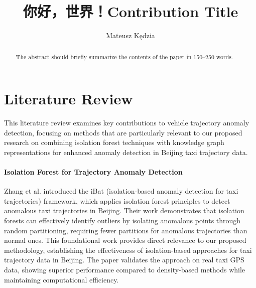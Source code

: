 \documentclass[runningheads]{llncs}
\newcommand{\zh}[1]{{\chinesefont #1}}
\begin{document}

\title{ \zh{你好，世界！}Contribution Title}
%
%
\author{Mateusz Kędzia}
%
\authorrunning{ \zh{你好，世界！} Author et al.}
%
%
\maketitle      %
%
\begin{abstract}
The abstract should briefly summarize the contents of the paper in
150--250 words.

\end{abstract}
%
%
\newpage

\section{Literature Review}
\label{sec:literature-review}

This literature review examines key contributions to vehicle trajectory anomaly detection, focusing on methods that are particularly relevant to our proposed research on combining isolation forest techniques with knowledge graph representations for enhanced anomaly detection in Beijing taxi trajectory data.

\paragraph{Isolation Forest for Trajectory Anomaly Detection}
Zhang et al. \cite{zhang2011ibat} introduced the iBat (isolation-based anomaly detection for taxi trajectories) framework, which applies isolation forest principles to detect anomalous taxi trajectories in Beijing. Their work demonstrates that isolation forests can effectively identify outliers by isolating anomalous points through random partitioning, requiring fewer partitions for anomalous trajectories than normal ones. This foundational work provides direct relevance to our proposed methodology, establishing the effectiveness of isolation-based approaches for taxi trajectory data in Beijing. The paper validates the approach on real taxi GPS data, showing superior performance compared to density-based methods while maintaining computational efficiency.
\end{document}
